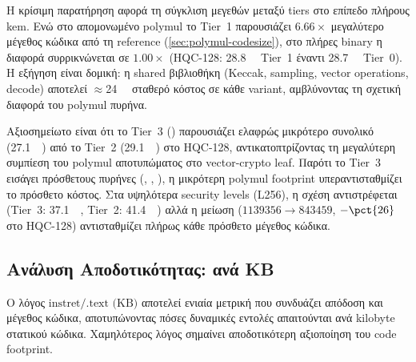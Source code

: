 \begin{table}[htbp]
  \centering
  \caption{Αποτύπωμα  πλήρους \KEM binary ανά tier και
    security level. Τα μεγέθη περιλαμβάνουν polymul, Keccak, decode,
    sampling, και shared  βιβλιοθήκη. Τα μεγέθη μετρήθηκαν με  στα τελικά πλήρη \KEM ELF binaries (), όχι στον polymul microbench harness (πρβλ.\ \cref{fig:code-size-dual-axis}). Πηγή δεδομένων:
    Spike ISS simulation CSVs (commit ).}
  \label{tab:code-size-deployment}
  \small
  
\end{table}

Η κρίσιμη παρατήρηση αφορά τη σύγκλιση μεγεθών μεταξύ tiers στο
επίπεδο πλήρους \gls{kem}. Ενώ στο απομονωμένο polymul το Tier~1 παρουσιάζει
$6.66\times$ μεγαλύτερο μέγεθος κώδικα από τη reference
(\cref{sec:polymul-codesize}), στο πλήρες binary η διαφορά συρρικνώνεται
σε $1.00\times$ (HQC-128: \SI{28.8}{\kilo\byte} Tier~1 έναντι
\SI{28.7}{\kilo\byte} Tier~0). Η εξήγηση είναι δομική: η shared
 βιβλιοθήκη (Keccak, sampling, vector operations, decode)
αποτελεί $\approx$\SI{24}{\kilo\byte} σταθερό κόστος σε κάθε variant,
αμβλύνοντας τη σχετική διαφορά του polymul πυρήνα.

Αξιοσημείωτο είναι ότι το Tier~3 () παρουσιάζει ελαφρώς
μικρότερο συνολικό  (\SI{27.1}{\kilo\byte}) από το Tier~2
(\SI{29.1}{\kilo\byte}) στο HQC-128, αντικατοπτρίζοντας τη μεγαλύτερη
συμπίεση του polymul αποτυπώματος στο vector-crypto leaf. Παρότι το Tier~3
εισάγει πρόσθετους πυρήνες (, ,
), η μικρότερη polymul footprint υπεραντισταθμίζει
το πρόσθετο κόστος. Στα υψηλότερα security levels (L256), η σχέση
αντιστρέφεται (Tier~3: \SI{37.1}{\kilo\byte}, Tier~2: \SI{41.4}{\kilo\byte})
αλλά η μείωση \instret ($\num{1139356} \to \num{843459}$, $-\pct{26}$ στο
\Decaps HQC-128) αντισταθμίζει πλήρως κάθε πρόσθετο μέγεθος κώδικα.

\subsection{Ανάλυση Αποδοτικότητας: \instret ανά KB}
\label{ssec:instret-per-kb}

Ο λόγος $\text{instret} / \text{.text (KB)}$ αποτελεί ενιαία μετρική που
συνδυάζει απόδοση και μέγεθος κώδικα, αποτυπώνοντας πόσες δυναμικές εντολές
απαιτούνται ανά kilobyte στατικού κώδικα. Χαμηλότερος λόγος σημαίνει
αποδοτικότερη αξιοποίηση του code footprint.


